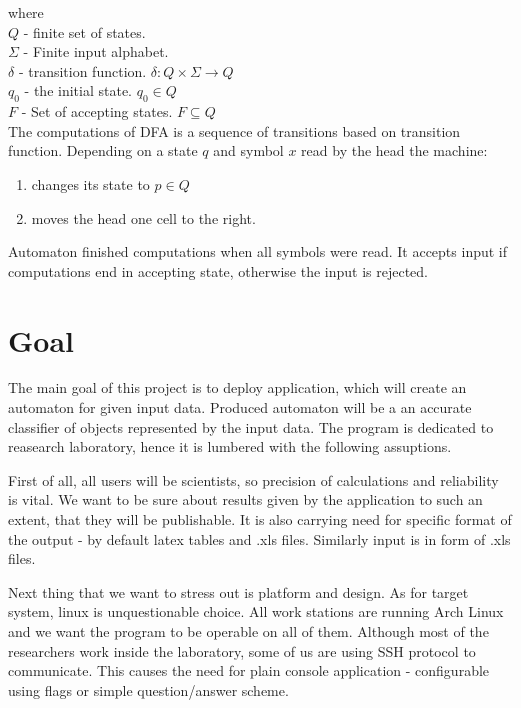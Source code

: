 \documentclass{article}
\begin{document}
\begin{itemize}
where \\
$Q$ - finite set of states. \\
$\Sigma$ - Finite input alphabet. \\
$\delta$ - transition function. $\delta: Q \times \Sigma \rightarrow Q$ \\
$q_0$ - the initial state. $q_0 \in Q$ \\
$F$ - Set of accepting states. $F \subseteq Q$ \\


The computations of DFA is a sequence of transitions based on transition function.
Depending on a state $q$ and symbol $x$ read by the head the machine:
\begin{enumerate}
	\item changes its state to $p \in Q$
	\item moves the head one cell to the right.
\end{enumerate}

Automaton finished computations when all symbols were read. It accepts input if computations end in accepting state, otherwise the input is rejected.



\end{itemize}


\newpage
\section{Goal}
The main goal of this project is to deploy application, which will create an automaton for given input data. Produced automaton will be a an accurate classifier of objects represented
by the input data. The program is dedicated to reasearch laboratory, hence it is lumbered with the following assuptions.


First of all, all users will be scientists, so precision of calculations and reliability is vital. We want to be sure about results given by the application to such an extent, that they will be publishable. It is also carrying need for specific format of the output - by default latex tables and .xls files. Similarly input is in form of .xls files.


Next thing that we want to stress out is platform and design. As for target system, linux is unquestionable choice. All work stations are running Arch Linux and we want the program to be operable on all of them. Although most of the researchers work inside the laboratory, some of us are using SSH protocol to communicate. This causes the need for plain console application - configurable using flags or simple question/answer scheme. 
\end{document}
